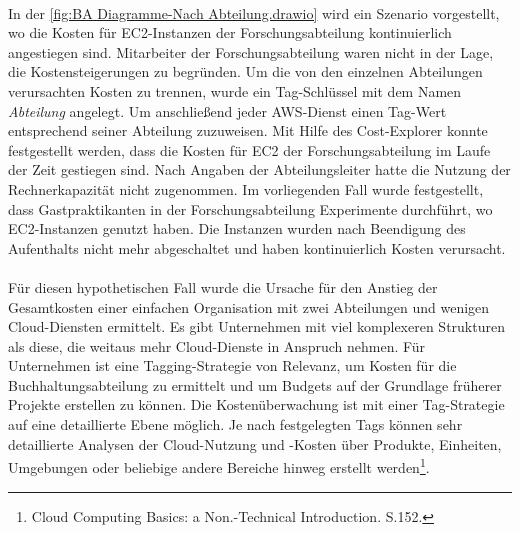 \\
In der \autoref{fig:BA Diagramme-Nach Abteilung.drawio} wird ein Szenario vorgestellt, wo die Kosten für EC2-Instanzen der Forschungsabteilung kontinuierlich angestiegen sind. Mitarbeiter der Forschungsabteilung waren nicht in der Lage, die Kostensteigerungen zu begründen. 
Um die von den einzelnen Abteilungen verursachten Kosten zu trennen, wurde ein Tag-Schlüssel mit dem Namen \textit{Abteilung} angelegt. Um anschließend jeder AWS-Dienst einen Tag-Wert entsprechend seiner Abteilung zuzuweisen. Mit Hilfe des Cost-Explorer konnte festgestellt werden, dass die Kosten für EC2 der Forschungsabteilung im Laufe der Zeit gestiegen sind. Nach Angaben der Abteilungsleiter hatte die Nutzung der Rechnerkapazität nicht zugenommen. Im vorliegenden Fall wurde festgestellt, dass Gastpraktikanten in der Forschungsabteilung Experimente durchführt, wo EC2-Instanzen genutzt haben. Die Instanzen wurden nach Beendigung des Aufenthalts nicht mehr abgeschaltet und haben kontinuierlich Kosten verursacht. 
\\\\
Für diesen hypothetischen Fall wurde die Ursache für den Anstieg der Gesamtkosten einer einfachen Organisation mit zwei Abteilungen und wenigen Cloud-Diensten ermittelt. Es gibt Unternehmen mit viel komplexeren Strukturen als diese, die weitaus mehr Cloud-Dienste in Anspruch nehmen. Für Unternehmen ist eine Tagging-Strategie von Relevanz, um Kosten für die Buchhaltungsabteilung zu ermittelt %
und um Budgets auf der Grundlage früherer Projekte erstellen zu können. Die Kostenüberwachung ist mit einer Tag-Strategie auf eine detaillierte Ebene möglich. Je nach festgelegten Tags können sehr detaillierte Analysen der Cloud-Nutzung und -Kosten über Produkte, Einheiten, Umgebungen oder beliebige andere Bereiche hinweg erstellt werden\footnote{Cloud Computing Basics: a Non.-Technical Introduction. S.152.\cite{CCB}}.
